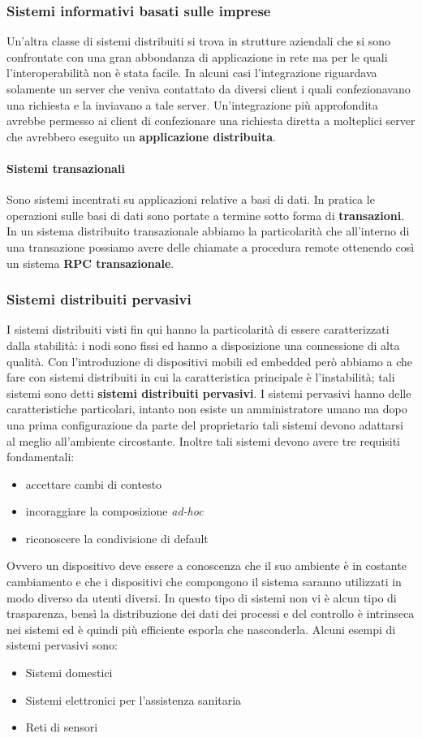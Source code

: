 \subsubsection{Sistemi informativi basati sulle imprese}
Un'altra classe di sistemi distribuiti si trova in strutture aziendali che si sono confrontate con una gran abbondanza di applicazione in rete ma per le quali l'interoperabilità non è stata facile. In alcuni casi l'integrazione riguardava solamente un server che veniva contattato da diversi client i quali confezionavano una richiesta e la inviavano a tale server. Un'integrazione più approfondita avrebbe permesso ai client di confezionare una richiesta diretta a molteplici server che avrebbero eseguito un \textbf{applicazione distribuita}.
\paragraph{Sistemi transazionali} Sono sistemi incentrati su applicazioni relative a basi di dati. In pratica le operazioni sulle basi di dati sono portate a termine sotto forma di \textbf{transazioni}. In un sistema distribuito transazionale abbiamo la particolarità che all'interno di una transazione possiamo avere delle chiamate a procedura remote ottenendo così un sistema \textbf{RPC transazionale}.
\subsubsection{Sistemi distribuiti pervasivi}
I sistemi distribuiti visti fin qui hanno la particolarità di essere caratterizzati dalla stabilità: i nodi sono fissi ed hanno a disposizione una connessione di alta qualità. Con l'introduzione di dispositivi mobili ed embedded però abbiamo a che fare con sistemi distribuiti in cui la caratteristica principale è l'instabilità; tali sistemi sono detti \textbf{sistemi distribuiti pervasivi}. I sistemi pervasivi hanno delle caratteristiche particolari, intanto non esiste un amministratore umano ma dopo una prima configurazione da parte del proprietario tali sistemi devono adattarsi al meglio all'ambiente circostante. Inoltre tali sistemi devono avere tre requisiti fondamentali:
\begin{itemize}
\item accettare cambi di contesto
\item incoraggiare la composizione \emph{ad-hoc}
\item riconoscere la condivisione di default
\end{itemize}
Ovvero un dispositivo deve essere a conoscenza che il suo ambiente è in costante cambiamento e che i dispositivi che compongono il sistema saranno utilizzati in modo diverso da utenti diversi.
In questo tipo di sistemi non vi è alcun tipo di trasparenza, bensì la distribuzione dei dati dei processi e del controllo è intrinseca nei sistemi ed è quindi più efficiente esporla che nasconderla.
Alcuni esempi di sistemi pervasivi sono:
\begin{itemize}
\item Sistemi domestici
\item Sistemi elettronici per l'assistenza sanitaria
\item Reti di sensori
\end{itemize}
